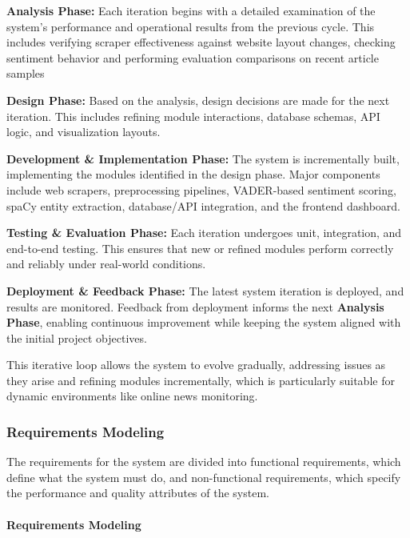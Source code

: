 \textbf{Analysis Phase:} Each iteration begins with a detailed examination of the system's performance and operational results from the previous cycle. This includes verifying scraper effectiveness against website layout changes, checking sentiment behavior and performing evaluation comparisons on recent article samples

\textbf{Design Phase:} Based on the analysis, design decisions are made for the next iteration. This includes refining module interactions, database schemas, API logic, and visualization layouts.

\textbf{Development \& Implementation Phase:} The system is incrementally built, implementing the modules identified in the design phase. Major components include web scrapers, preprocessing pipelines, VADER-based sentiment scoring, spaCy entity extraction, database/API integration, and the frontend dashboard.

\textbf{Testing \& Evaluation Phase:} Each iteration undergoes unit, integration, and end-to-end testing. This ensures that new or refined modules perform correctly and reliably under real-world conditions.

\textbf{Deployment \& Feedback Phase:} The latest system iteration is deployed, and results are monitored. Feedback from deployment informs the next \textbf{Analysis Phase}, enabling continuous improvement while keeping the system aligned with the initial project objectives.

This iterative loop allows the system to evolve gradually, addressing issues as they arise and refining modules incrementally, which is particularly suitable for dynamic environments like online news monitoring.

\subsubsection{\texorpdfstring{\textbf{Requirements Modeling}}{Requirements Modeling}}\label{requirements-modeling}

The requirements for the system are divided into functional requirements, which define what the system must do, and non-functional requirements, which specify the performance and quality attributes of the system.

\paragraph{\texorpdfstring{\textbf{Requirements Modeling}}{Requirements Modeling}}\label{requirements-modeling-1}

